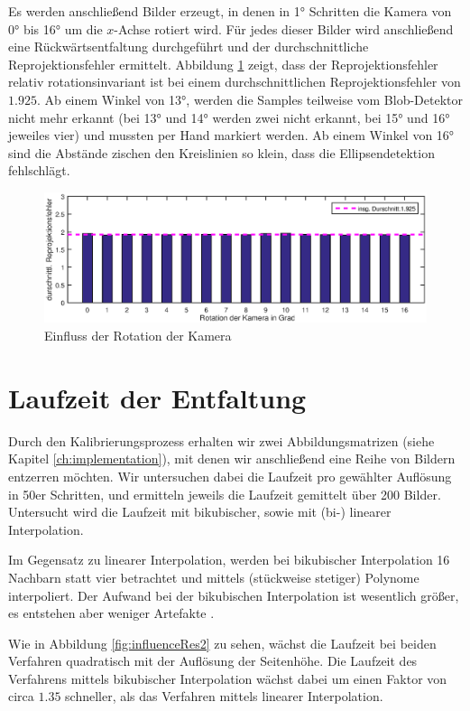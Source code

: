 Es werden anschließend Bilder erzeugt, in denen in 1° Schritten die Kamera von 0° bis 16° um die $x$-Achse rotiert wird. Für jedes dieser Bilder wird anschließend eine Rückwärtsentfaltung durchgeführt und der durchschnittliche Reprojektionsfehler ermittelt. Abbildung \ref{fig:influenceRot} zeigt, dass der Reprojektionsfehler relativ rotationsinvariant ist bei einem durchschnittlichen Reprojektionsfehler von $1.925$. Ab einem Winkel von  13°, werden die Samples teilweise vom Blob-Detektor nicht mehr erkannt (bei 13° und 14° werden zwei nicht erkannt, bei 15° und 16° jeweiles vier) und mussten per Hand markiert werden. Ab einem Winkel von 16° sind die Abstände zischen den Kreislinien so klein, dass die Ellipsendetektion fehlschlägt.


\begin{figure}[!htb]
	\centering
	\includegraphics[width=\textwidth]{images/reprojectionErrorDeg2.eps}
	\caption{Einfluss der Rotation der Kamera}
	\label{fig:influenceRot}
\end{figure}


\section{Laufzeit der Entfaltung}
Durch den Kalibrierungsprozess erhalten wir zwei Abbildungsmatrizen (siehe Kapitel \ref{ch:implementation}), mit denen wir anschließend eine Reihe von Bildern entzerren möchten. Wir untersuchen dabei die Laufzeit pro gewählter Auflösung in 50er Schritten, und ermitteln jeweils die Laufzeit gemittelt über 200 Bilder. Untersucht wird die Laufzeit mit bikubischer, sowie mit (bi-) linearer Interpolation.

Im Gegensatz zu linearer Interpolation, werden bei bikubischer Interpolation 16 Nachbarn statt vier betrachtet und mittels (stückweise stetiger) Polynome interpoliert. Der Aufwand bei der bikubischen Interpolation ist wesentlich größer, es entstehen aber weniger Artefakte \cite{Keys1981}.

Wie in Abbildung \ref{fig:influenceRes2} zu sehen, wächst die Laufzeit bei beiden Verfahren quadratisch mit der Auflösung der Seitenhöhe. Die Laufzeit des Verfahrens mittels bikubischer Interpolation wächst dabei um einen Faktor von circa $1.35$ schneller, als das Verfahren mittels linearer Interpolation.

